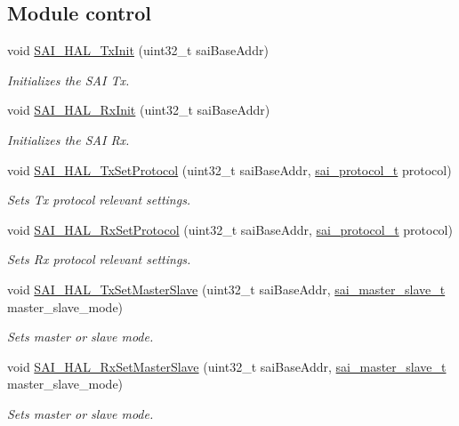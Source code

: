 \subsection*{Module control}
\begin{DoxyCompactItemize}
\item 
void \hyperlink{group__sai__hal_ga364d34eba9aa023c417d56a8c685c4c4}{S\+A\+I\+\_\+\+H\+A\+L\+\_\+\+Tx\+Init} (uint32\+\_\+t sai\+Base\+Addr)
\begin{DoxyCompactList}\small\item\em Initializes the S\+AI Tx. \end{DoxyCompactList}\item 
void \hyperlink{group__sai__hal_gabca11870bf673648eb222a808c258ff7}{S\+A\+I\+\_\+\+H\+A\+L\+\_\+\+Rx\+Init} (uint32\+\_\+t sai\+Base\+Addr)
\begin{DoxyCompactList}\small\item\em Initializes the S\+AI Rx. \end{DoxyCompactList}\item 
void \hyperlink{group__sai__hal_ga5f208126a041bf5d09735dd3d4d88691}{S\+A\+I\+\_\+\+H\+A\+L\+\_\+\+Tx\+Set\+Protocol} (uint32\+\_\+t sai\+Base\+Addr, \hyperlink{group__sai__hal_ga2f1f1a725e4d1540d8dfccbdaed66b26}{sai\+\_\+protocol\+\_\+t} protocol)
\begin{DoxyCompactList}\small\item\em Sets Tx protocol relevant settings. \end{DoxyCompactList}\item 
void \hyperlink{group__sai__hal_gae7b6e30854d4694ee17feaf7299d59fa}{S\+A\+I\+\_\+\+H\+A\+L\+\_\+\+Rx\+Set\+Protocol} (uint32\+\_\+t sai\+Base\+Addr, \hyperlink{group__sai__hal_ga2f1f1a725e4d1540d8dfccbdaed66b26}{sai\+\_\+protocol\+\_\+t} protocol)
\begin{DoxyCompactList}\small\item\em Sets Rx protocol relevant settings. \end{DoxyCompactList}\item 
void \hyperlink{group__sai__hal_ga071ce3e1ed30924db84362592d39ea06}{S\+A\+I\+\_\+\+H\+A\+L\+\_\+\+Tx\+Set\+Master\+Slave} (uint32\+\_\+t sai\+Base\+Addr, \hyperlink{group__sai__hal_ga90144d956adefe0eaf778868dd06dab4}{sai\+\_\+master\+\_\+slave\+\_\+t} master\+\_\+slave\+\_\+mode)
\begin{DoxyCompactList}\small\item\em Sets master or slave mode. \end{DoxyCompactList}\item 
void \hyperlink{group__sai__hal_ga658c40fd83ff84ef5cc547ae7c579d2d}{S\+A\+I\+\_\+\+H\+A\+L\+\_\+\+Rx\+Set\+Master\+Slave} (uint32\+\_\+t sai\+Base\+Addr, \hyperlink{group__sai__hal_ga90144d956adefe0eaf778868dd06dab4}{sai\+\_\+master\+\_\+slave\+\_\+t} master\+\_\+slave\+\_\+mode)
\begin{DoxyCompactList}\small\item\em Sets master or slave mode. \end{DoxyCompactList}\end{DoxyCompactItemize}
